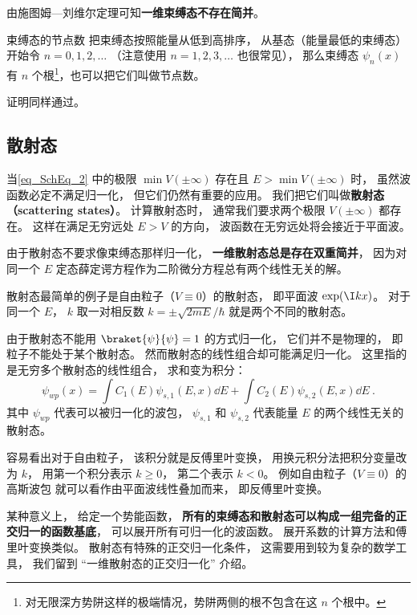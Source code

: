 由施图姆—刘维尔定理可知\textbf{一维束缚态不存在简并}。

\begin{theorem}{束缚态的节点数}
把束缚态按照能量从低到高排序， 从基态（能量最低的束缚态）开始令 $n = 0,1,2,\dots$ （注意使用 $n=1,2,3,\dots$ 也很常见）， 那么束缚态 $\psi_n(x)$ 有 $n$ 个根\footnote{对无限深方势阱这样的极端情况，势阱两侧的根不包含在这 $n$ 个根中。}，也可以把它们叫做节点数。
\end{theorem}
证明同样通过。

\subsection{散射态}
当\autoref{eq_SchEq_2} 中的极限 $\min V(\pm\infty)$ 存在且 $E > \min V(\pm\infty)$ 时， 虽然波函数必定不满足归一化， 但它们仍然有重要的应用。 我们把它们叫做\textbf{散射态（scattering states）}。 计算散射态时， 通常我们要求两个极限 $V(\pm \infty)$ 都存在。 这样在满足无穷远处 $E > V$ 的方向， 波函数在无穷远处将会接近于平面波。

由于散射态不要求像束缚态那样归一化， \textbf{一维散射态总是存在双重简并}， 因为对同一个 $E$ 定态薛定谔方程作为二阶微分方程总有两个线性无关的解。%

散射态最简单的例子是自由粒子（$V\equiv 0$）的散射态， 即平面波 $\exp(\I kx)$。 对于同一个 $E$， $k$ 取一对相反数 $k = \pm\sqrt{2mE}/\hbar$ 就是两个不同的散射态。

由于散射态不能用 $\braket{\psi}{\psi} = 1$ 的方式归一化， 它们并不是物理的， 即粒子不能处于某个散射态。 然而散射态的线性组合却可能满足归一化。 这里指的是无穷多个散射态的线性组合， 求和变为积分：
\begin{equation}
\psi_{wp}(x) = \int C_1(E) \psi_{s,1}(E, x)\dd{E} + \int C_2(E) \psi_{s,2}(E, x)\dd{E}~.
\end{equation}
其中 $\psi_{wp}$ 代表可以被归一化的波包， $\psi_{s,1}$ 和 $\psi_{s,2}$ 代表能量 $E$ 的两个线性无关的散射态。

容易看出对于自由粒子， 该积分就是反傅里叶变换， 用换元积分法把积分变量改为 $k$， 用第一个积分表示 $k\ge 0$， 第二个表示 $k<0$。 例如自由粒子（$V \equiv 0$）的高斯波包 就可以看作由平面波线性叠加而来， 即反傅里叶变换。

某种意义上， 给定一个势能函数， \textbf{所有的束缚态和散射态可以构成一组完备的正交归一的函数基底}， 可以展开所有可归一化的波函数。 展开系数的计算方法和傅里叶变换类似。 散射态有特殊的正交归一化条件， 这需要用到较为复杂的数学工具， 我们留到 “一维散射态的正交归一化” 介绍。

